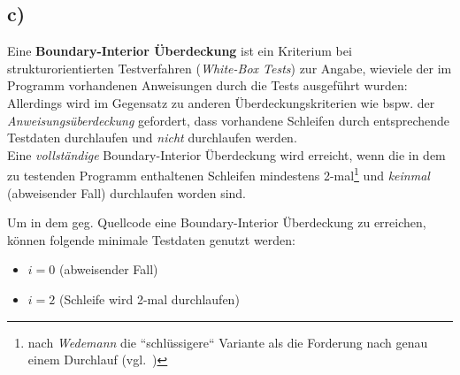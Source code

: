 \subsection*{c)}

Eine \textbf{Boundary-Interior Überdeckung} ist ein Kriterium bei strukturorientierten Testverfahren (\textit{White-Box Tests}) zur Angabe, wieviele der im Programm vorhandenen Anweisungen durch die Tests ausgeführt wurden: Allerdings wird im Gegensatz zu anderen Überdeckungskriterien wie bspw. der  \textit{Anweisungsüberdeckung} gefordert, dass vorhandene Schleifen durch entsprechende Testdaten durchlaufen und \textit{nicht} durchlaufen werden.\\

\noindent
Eine \textit{vollständige} Boundary-Interior Überdeckung wird erreicht, wenn die in dem zu testenden Programm enthaltenen Schleifen mindestens 2-mal\footnote{
nach \textit{Wedemann} die ``schlüssigere`` Variante als die Forderung nach genau einem Durchlauf (vgl.~\cite[52]{Wed09c})
} und  \textit{keinmal} (abweisender Fall)  durchlaufen worden sind.

\noindent
Um in dem geg. Quellcode eine  Boundary-Interior Überdeckung zu erreichen, können folgende minimale Testdaten genutzt werden:

\begin{itemize}
    \item $i=0$ (abweisender Fall)
    \item $i=2$ (Schleife wird 2-mal durchlaufen)
\end{itemize}